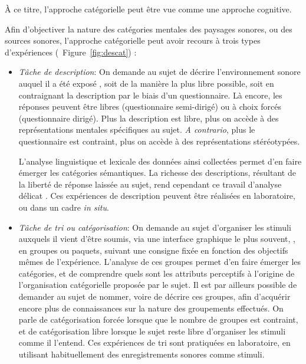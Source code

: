 {À ce titre, l'approche catégorielle peut être vue comme une approche cognitive. 

Afin d'objectiver la nature des catégories mentales   des paysages sonores, ou des sources sonores, l'approche catégorielle peut avoir recours à trois types d'expériences (\cf~Figure~\ref{fig:descat}) :

\begin{itemize}
\item \emph{Tâche de description}: On  demande au sujet de décrire l'environnement sonore auquel il a été exposé \citep{axelsson2005soundscape,raimbault2005urban,guastavino2006ideal,raimbault2006qualitative}, soit de la manière la plus libre possible, soit en contraignant la description par le biais d'un questionnaire. Là encore, les réponses peuvent être libres (questionnaire semi-dirigé) ou à choix forcés (questionnaire dirigé). Plus la description est libre, plus on accède à des représentations mentales spécifiques au sujet. \emph{A contrario}, plus le questionnaire est contraint, plus on accède à des représentations stéréotypées. 

L'analyse linguistique et lexicale des données ainsi collectées permet d'en faire émerger les catégories sémantiques. La richesse des descriptions, résultant de la liberté de réponse laissée au sujet, rend cependant ce travail d'analyse délicat . Ces expériences de description peuvent être réalisées en laboratoire, ou dans un cadre \emph{in situ}.

\item \emph{Tâche de tri ou catégorisation}: On  demande au sujet d'organiser les stimuli auxquels il vient d'être soumis, via une interface graphique le plus souvent, \citep{maffiolo_caracterisation_1999,guastavino2007categorization}, en groupes ou paquets, suivant une consigne fixée en fonction des objectifs mêmes de l'expérience. L'analyse de ces groupes permet d'en faire émerger les catégories, et de comprendre quels sont les attributs perceptifs à l'origine de l'organisation catégorielle proposée par le sujet. Il est par ailleurs possible de demander au sujet de nommer, voire de décrire ces groupes, afin d'acquérir encore plus de connaissances sur la nature des groupements effectués. On parle de catégorisation forcée lorsque que le nombre de groupes est contraint, et de catégorisation libre lorsque le sujet reste libre d'organiser les stimuli comme il l'entend. Ces expériences de tri sont pratiquées en laboratoire, en utilisant habituellement des enregistrements sonores comme stimuli.


\end{itemize}}

